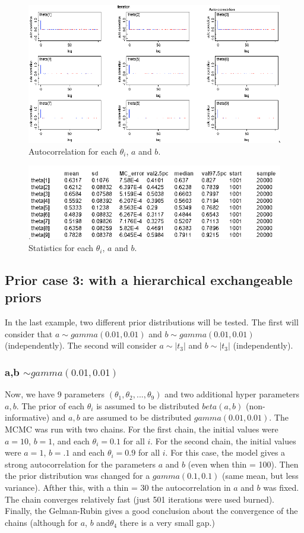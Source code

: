 \documentclass{article}
\begin{document}
  \newpage
  \begin{figure}[ht!]
  \centering
  \includegraphics[width=.65\textwidth]{imgs/M2_4.png}
  \caption{Autocorrelation for each $\theta_i$, $a$ and $b$.}
  \label{fig:fig5}
  \end{figure}
  
  \begin{figure}[ht!]
  \centering
  \includegraphics[width=.8\textwidth]{imgs/M2_5.png}
  \caption{Statistics for each $\theta_i$, $a$ and $b$.}
  \label{fig:fig6}
  \end{figure}
   
\subsection{Prior case 3: with a hierarchical exchangeable priors}

In the last example, two different prior distributions will be tested. The first will consider that $a \sim gamma(0.01, 0.01)$ and $b \sim gamma(0.01, 0.01)$ (independently). The second will consider $a \sim |t_3|$ and $b \sim |t_3|$ (independently).

\subsubsection{a,b $\sim gamma(0.01, 0.01)$}
Now, we have 9 parameters $(\theta_1, \theta_2, ..., \theta_9)$ and two additional hyper parameters $a,b$. The prior of each $\theta_i$ is assumed to be distributed $beta(a,b)$ (non-informative) and $a,b$ are assumed to be distributed $gamma(0.01, 0.01)$. The MCMC was run with two chains. For the first chain, the initial values were $a = 10$, $b = 1$, and each $\theta_i = 0.1$ for all $i$. For the second chain, the initial values were $a = 1$, $b = .1$ and each $\theta_i = 0.9$ for all $i$. For this case, the model gives a strong autocorrelation for the parameters $a$ and $b$ (even when thin = 100). Then the prior distribution was changed for a $gamma(0.1, 0.1)$ (same mean, but less variance). Afther this, with a thin = 30 the autocorrelation in $a$ and $b$ was fixed. The chain converges relatively fast (just 501 iterations were used burned). Finally, the Gelman-Rubin gives a good conclusion about the convergence of the chains (although for $a$, $b$ and$\theta_4$ there is a very small gap.)
\end{document}
